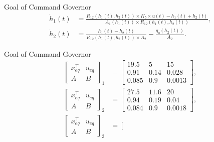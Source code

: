 \begin{slide}{Goal of Command Governor}
  \begin{equation}
    \label{eq:formula-height-variation}
    \begin{aligned}
      \dot{h}_1(t) & = \frac{R_{12}(h_{1}(t),h_{2}(t))\times{}K_{b}\times{}u(t)-h_{1}(t)+h_{2}(t)}
      {A_{1}(h_{1}(t))\times{}R_{12}(h_{1}(t),h_{2}(t))},                                                                \\
      \dot{h}_2(t) & = \frac{h_{1}(t)-h_{2}(t)}{R_{12}(h_{1}(t),h_{2}(t))\times{}A_{2}} - \frac{q_{o}(h_{2}(t))}{A_{2}}.
    \end{aligned}
  \end{equation}
\end{slide}

\begin{slide}{Goal of Command Governor}
  \begin{equation}
    \begin{aligned}
      \label{eq:op-points}
      \left[\begin{array}{c|c}
          x_{eq}^{\top} & u_{eq} \\
          \hline
          A             & B
        \end{array}\right]_{1} & = \left[\begin{array}{cc|c}
          19.5  & 5    & 15     \\
          \hline
          0.91  & 0.14 & 0.028  \\
          0.085 & 0.9  & 0.0013
        \end{array}\right], \\
      \left[\begin{array}{c|c}
          x_{eq}^{\top} & u_{eq} \\
          \hline
          A             & B
        \end{array}\right]_{2} & = \left[\begin{array}{cc|c}
          27.5  & 11.6 & 20     \\
          \hline
          0.94  & 0.19 & 0.04   \\
          0.084 & 0.9  & 0.0018
        \end{array}\right], \\
      \left[\begin{array}{c|c}
          x_{eq}^{\top} & u_{eq} \\
          \hline
          A             & B
        \end{array}\right]_{3} & = \left[\begin{array}{cc|c}

\end{array}
\end{aligned}
\end{equation}
\end{slide}
